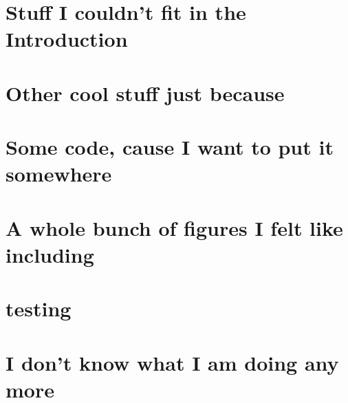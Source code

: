 
\section{Stuff I couldn't fit in the Introduction}

\section{Other cool stuff just because}


\section{Some code, cause I want to put it somewhere}


\section{A whole bunch of figures I felt like including}
\pagebreak
\section{testing}


\section{I don't know what I am doing any more}
